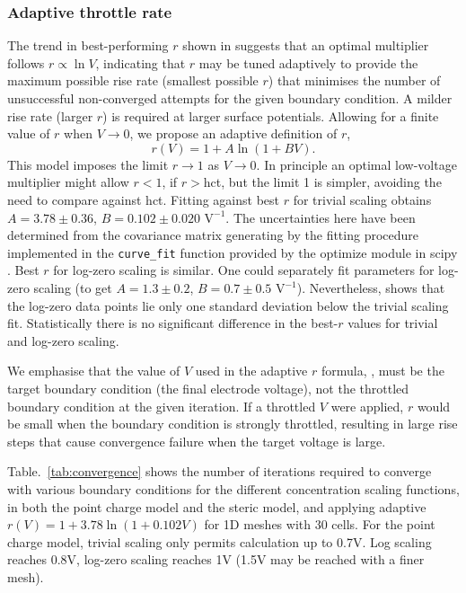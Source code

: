 \subsubsection{Adaptive throttle rate}
The trend in best-performing $r$ shown in  suggests that an
optimal multiplier follows
$r \propto \ln V$, indicating that $r$ 
may be tuned adaptively to provide the maximum possible rise rate (smallest
possible $r$) that minimises the number of unsuccessful non-converged
attempts for the given boundary condition.  A milder
rise rate (larger $r$) is required at larger surface potentials.
Allowing for a finite value of $r$ when $V \rightarrow 0$, we propose
an adaptive definition of $r$,
\begin{equation}
  r(V) = 1 + A \ln(1 + B V).
  \label{adaptive_r}
\end{equation}
This model imposes the limit $r \rightarrow 1$ as $V \rightarrow 0$.
In principle an optimal low-voltage multiplier might allow $r<1$, if
$r>$hct, but the limit 1 is simpler, avoiding the need to 
compare against hct.  Fitting against best $r$ for trivial scaling
obtains $A=3.78 \pm 0.36$, $B=0.102 \pm 0.020 \textrm{ V}^{-1}$.
The uncertainties here have been determined from the covariance matrix
generating by the fitting procedure implemented in the
\verb|curve_fit| function provided by the optimize module in scipy
\cite{VugrinSwilerRobertsStuckyMackSullivan2007}. 
 Best $r$ for log-zero scaling is similar. One could separately fit
 parameters for log-zero scaling (to get
 $A=1.3\pm 0.2$, $B=0.7 \pm 0.5 \textrm{ V}^{-1}$).
 Nevertheless,   shows that the
 log-zero data points lie only one standard deviation below the trivial
scaling fit. Statistically there is no significant difference in the
best-$r$ values for trivial and log-zero scaling.

We emphasise that the value of $V$ used in the adaptive $r$ formula, ,
must be the target boundary condition (the final electrode voltage),
not the throttled boundary condition at the given iteration.  If a throttled $V$ were
applied, $r$ would be small when the boundary condition is strongly
throttled, resulting in large rise steps that cause convergence
failure when the  target voltage is large.


Table.~\ref{tab:convergence} shows  the number of iterations required
to converge with various boundary conditions for the different
concentration scaling functions, in both the point charge model and the
steric model, and applying adaptive
$r(V)=1+3.78\ln(1+0.102V)$ for 1D meshes with 30 cells. For the point charge model, trivial scaling only
permits calculation up to 0.7V. Log scaling reaches 0.8V, log-zero
scaling reaches 1V (1.5V may be reached with a finer mesh).

